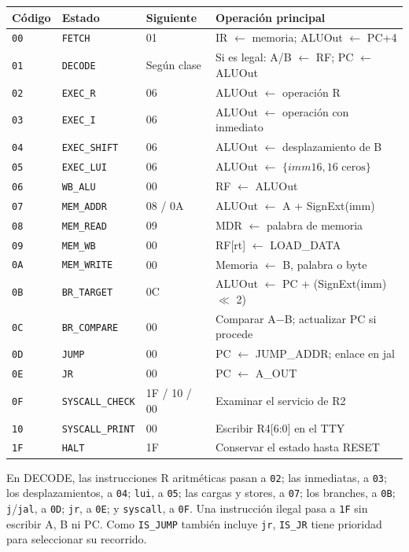 \documentclass[11pt,a4paper]{article}
\newcommand{\sig}[1]{\texttt{#1}}
\begin{document}
\begin{center}
\small\setlength{\tabcolsep}{4pt}
\begin{tabularx}{\linewidth}{@{}l l l X@{}}
\toprule
Código & Estado & Siguiente & Operación principal \\
\midrule
\sig{00} & \sig{FETCH} & 01 & IR $\leftarrow$ memoria; ALUOut $\leftarrow$ PC+4 \\
\sig{01} & \sig{DECODE} & Según clase & Si es legal: A/B $\leftarrow$ RF; PC $\leftarrow$ ALUOut \\
\sig{02} & \sig{EXEC\_R} & 06 & ALUOut $\leftarrow$ operación R \\
\sig{03} & \sig{EXEC\_I} & 06 & ALUOut $\leftarrow$ operación con inmediato \\
\sig{04} & \sig{EXEC\_SHIFT} & 06 & ALUOut $\leftarrow$ desplazamiento de B \\
\sig{05} & \sig{EXEC\_LUI} & 06 & ALUOut $\leftarrow$ $\{imm16,16\text{ ceros}\}$ \\
\sig{06} & \sig{WB\_ALU} & 00 & RF $\leftarrow$ ALUOut \\
\sig{07} & \sig{MEM\_ADDR} & 08 / 0A & ALUOut $\leftarrow$ A + SignExt(imm) \\
\sig{08} & \sig{MEM\_READ} & 09 & MDR $\leftarrow$ palabra de memoria \\
\sig{09} & \sig{MEM\_WB} & 00 & RF[rt] $\leftarrow$ LOAD\_DATA \\
\sig{0A} & \sig{MEM\_WRITE} & 00 & Memoria $\leftarrow$ B, palabra o byte \\
\sig{0B} & \sig{BR\_TARGET} & 0C & ALUOut $\leftarrow$ PC + (SignExt(imm) $\ll$ 2) \\
\sig{0C} & \sig{BR\_COMPARE} & 00 & Comparar A$-$B; actualizar PC si procede \\
\sig{0D} & \sig{JUMP} & 00 & PC $\leftarrow$ JUMP\_ADDR; enlace en jal \\
\sig{0E} & \sig{JR} & 00 & PC $\leftarrow$ A\_OUT \\
\sig{0F} & \sig{SYSCALL\_CHECK} & 1F / 10 / 00 & Examinar el servicio de R2 \\
\sig{10} & \sig{SYSCALL\_PRINT} & 00 & Escribir R4[6:0] en el TTY \\
\sig{1F} & \sig{HALT} & 1F & Conservar el estado hasta RESET \\
\bottomrule
\end{tabularx}
\label{tab:fsm}
\end{center}

En DECODE, las instrucciones R aritméticas pasan a \sig{02}; las inmediatas,
a \sig{03}; los desplazamientos, a \sig{04}; \sig{lui}, a \sig{05}; las
cargas y stores, a \sig{07}; los branches, a \sig{0B}; \sig{j}/\sig{jal},
a \sig{0D}; \sig{jr}, a \sig{0E}; y \sig{syscall}, a \sig{0F}. Una
instrucción ilegal pasa a \sig{1F} sin escribir A, B ni PC. Como
\sig{IS\_JUMP} también incluye \sig{jr}, \sig{IS\_JR} tiene prioridad
para seleccionar su recorrido.
\end{document}
